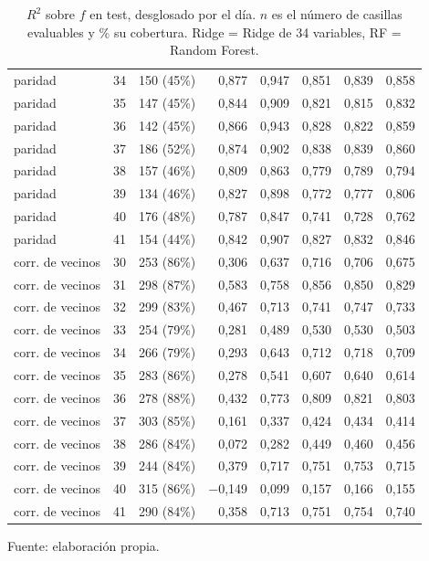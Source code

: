 \begin{table}[htbp]
{\begin{tabular}{@{}lrrrrrrr@{}}
        paridad & 34 & 150 (45\%) & 0,877 & 0,947 & 0,851 & 0,839 & 0,858 \\
        paridad & 35 & 147 (45\%) & 0,844 & 0,909 & 0,821 & 0,815 & 0,832 \\
        paridad & 36 & 142 (45\%) & 0,866 & 0,943 & 0,828 & 0,822 & 0,859 \\
        paridad & 37 & 186 (52\%) & 0,874 & 0,902 & 0,838 & 0,839 & 0,860 \\
        paridad & 38 & 157 (46\%) & 0,809 & 0,863 & 0,779 & 0,789 & 0,794 \\
        paridad & 39 & 134 (46\%) & 0,827 & 0,898 & 0,772 & 0,777 & 0,806 \\
        paridad & 40 & 176 (48\%) & 0,787 & 0,847 & 0,741 & 0,728 & 0,762 \\
        paridad & 41 & 154 (44\%) & 0,842 & 0,907 & 0,827 & 0,832 & 0,846 \\
        corr. de vecinos & 30 & 253 (86\%) & 0,306 & 0,637 & 0,716 & 0,706 & 0,675 \\
        corr. de vecinos & 31 & 298 (87\%) & 0,583 & 0,758 & 0,856 & 0,850 & 0,829 \\
        corr. de vecinos & 32 & 299 (83\%) & 0,467 & 0,713 & 0,741 & 0,747 & 0,733 \\
        corr. de vecinos & 33 & 254 (79\%) & 0,281 & 0,489 & 0,530 & 0,530 & 0,503 \\
        corr. de vecinos & 34 & 266 (79\%) & 0,293 & 0,643 & 0,712 & 0,718 & 0,709 \\
        corr. de vecinos & 35 & 283 (86\%) & 0,278 & 0,541 & 0,607 & 0,640 & 0,614 \\
        corr. de vecinos & 36 & 278 (88\%) & 0,432 & 0,773 & 0,809 & 0,821 & 0,803 \\
        corr. de vecinos & 37 & 303 (85\%) & 0,161 & 0,337 & 0,424 & 0,434 & 0,414 \\
        corr. de vecinos & 38 & 286 (84\%) & 0,072 & 0,282 & 0,449 & 0,460 & 0,456 \\
        corr. de vecinos & 39 & 244 (84\%) & 0,379 & 0,717 & 0,751 & 0,753 & 0,715 \\
        corr. de vecinos & 40 & 315 (86\%) & $-$0,149 & 0,099 & 0,157 & 0,166 & 0,155 \\
        corr. de vecinos & 41 & 290 (84\%) & 0,358 & 0,713 & 0,751 & 0,754 & 0,740 \\
        \bottomrule
    \end{tabular}}

    \caption{$R^2$ sobre $f$ en test, desglosado por el día. $n$ es el número de casillas evaluables y \% su cobertura. Ridge = Ridge de 34 variables, RF = Random Forest.}
    \label{tab:v3_tiempo_r2}

    {\footnotesize Fuente: elaboración propia.}
\end{table}
